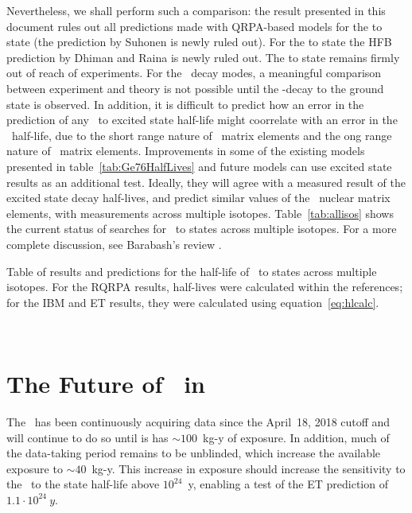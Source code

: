 \documentclass[/main.tex]{subfiles}
\begin{document}
Nevertheless, we shall perform such a comparison: the result presented in this document rules out all predictions made with QRPA-based models for the \tnbb to  state (the prediction by Suhonen\cite{gerdaESresult} is newly ruled out).
For the \tnbb to  state the HFB prediction by Dhiman and Raina\cite{dhiman1994} is newly ruled out.
The \tnbb to  state remains firmly out of reach of experiments.
For the \znbb\ decay modes, a meaningful comparison between experiment and theory is not possible until the \znbb -decay to the ground state is observed.
In addition, it is difficult to predict how an error in the prediction of any \tnbb\ to excited state half-life might coorrelate with an error in the \znbb\ half-life, due to the short range nature of \znbb\ matrix elements and the ong range nature of \tnbb\ matrix elements.
Improvements in some of the existing models presented in table~\ref{tab:Ge76HalfLives} and future models can use excited state results as an additional test.
Ideally, they will agree with a measured result of the excited state decay half-lives, and predict similar values of the \znbb\ nuclear matrix elements, with measurements across multiple isotopes.
Table~\ref{tab:allisos} shows the current status of searches for \tnbb\ to  states across multiple isotopes.
For a more complete discussion, see Barabash's review \cite{barabash2017}. 
\begin{table}
  \centering
  \caption[Table of \tnbb\ to  states across multiple isotopes]{\label{tab:allisos}
    Table of results and predictions for the half-life of \tnbb\ to  states across multiple isotopes. For the RQRPA results, half-lives were calculated within the references; for the IBM and ET results, they were calculated using equation~\ref{eq:hlcalc}.
  }
  
\end{table}
\\
\section{The Future of \bbes\ in }
The \MJD\ has been continuously acquiring data since the April~18, 2018 cutoff and will continue to do so until is has $\sim100$~kg-y of exposure.
In addition, much of the data-taking period remains to be unblinded, which increase the available exposure to $\sim40$~kg-y.
This increase in exposure should increase the sensitivity to the \bbes\ to the  state half-life above $10^{24}$~y, enabling a test of the ET prediction of $1.1\cdot10^{24}~y$\cite{menendez2018}.
\\
\end{document}
